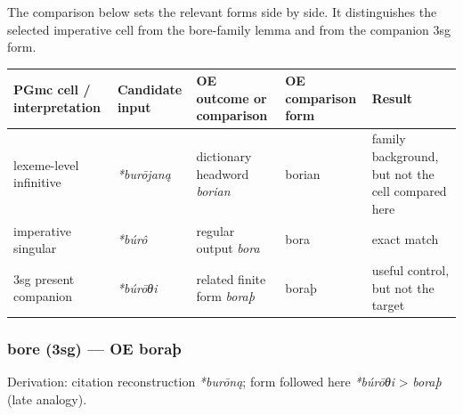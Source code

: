\documentclass[
  british,
  a4paper,
]{article}
\newcounter{none} %
\begin{document}
The comparison below sets the relevant forms side by side. It
distinguishes the selected imperative cell from the bore-family lemma
and from the companion 3sg form.

{\def\LTcaptype{none} %
\begin{longtable}[]{@{}
  >{\raggedright\arraybackslash}p{}
  >{\raggedright\arraybackslash}p{}
  >{\raggedright\arraybackslash}p{}
  >{\raggedright\arraybackslash}p{}
  >{\raggedright\arraybackslash}p{}@{}}
\toprule\noalign{}
\begin{minipage}[b]{\linewidth}\raggedright
PGmc cell / interpretation
\end{minipage} & \begin{minipage}[b]{\linewidth}\raggedright
Candidate input
\end{minipage} & \begin{minipage}[b]{\linewidth}\raggedright
OE outcome or comparison
\end{minipage} & \begin{minipage}[b]{\linewidth}\raggedright
OE comparison form
\end{minipage} & \begin{minipage}[b]{\linewidth}\raggedright
Result
\end{minipage} \\
\midrule\noalign{}
\endhead
\bottomrule\noalign{}
\endlastfoot
lexeme-level infinitive & \emph{*burōjaną} & dictionary headword
\emph{borian} & borian & family background, but not the cell compared
here \\
imperative singular & \emph{*búrô} & regular output \emph{bora} & bora &
exact match \\
3sg present companion & \emph{*búrōθi} & related finite form
\emph{boraþ} & boraþ & useful control, but not the target \\
\end{longtable}
}

\subsubsection{bore (3sg) --- OE boraþ}\label{bore-3sg-oe-borauxfe}

Derivation: citation reconstruction \emph{*burōną}; form followed here
\emph{*búrōθi} \textgreater{} \emph{boraþ} (late analogy).
\end{document}
